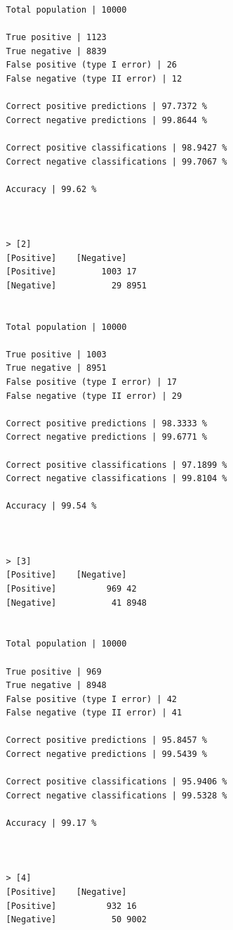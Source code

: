 \documentclass{classrep}
\begin{document}
{{{\begin{lstlisting}
                Total population | 10000

                True positive | 1123
                True negative | 8839
                False positive (type I error) | 26
                False negative (type II error) | 12

                Correct positive predictions | 97.7372 %
                Correct negative predictions | 99.8644 %

                Correct positive classifications | 98.9427 %
                Correct negative classifications | 99.7067 %

                Accuracy | 99.62 %



                > [2]
                [Positive]    [Negative]
                [Positive]         1003 17
                [Negative]           29 8951


                Total population | 10000

                True positive | 1003
                True negative | 8951
                False positive (type I error) | 17
                False negative (type II error) | 29

                Correct positive predictions | 98.3333 %
                Correct negative predictions | 99.6771 %

                Correct positive classifications | 97.1899 %
                Correct negative classifications | 99.8104 %

                Accuracy | 99.54 %



                > [3]
                [Positive]    [Negative]
                [Positive]          969 42
                [Negative]           41 8948


                Total population | 10000

                True positive | 969
                True negative | 8948
                False positive (type I error) | 42
                False negative (type II error) | 41

                Correct positive predictions | 95.8457 %
                Correct negative predictions | 99.5439 %

                Correct positive classifications | 95.9406 %
                Correct negative classifications | 99.5328 %

                Accuracy | 99.17 %



                > [4]
                [Positive]    [Negative]
                [Positive]          932 16
                [Negative]           50 9002



\end{lstlisting}}}}
\end{document}
